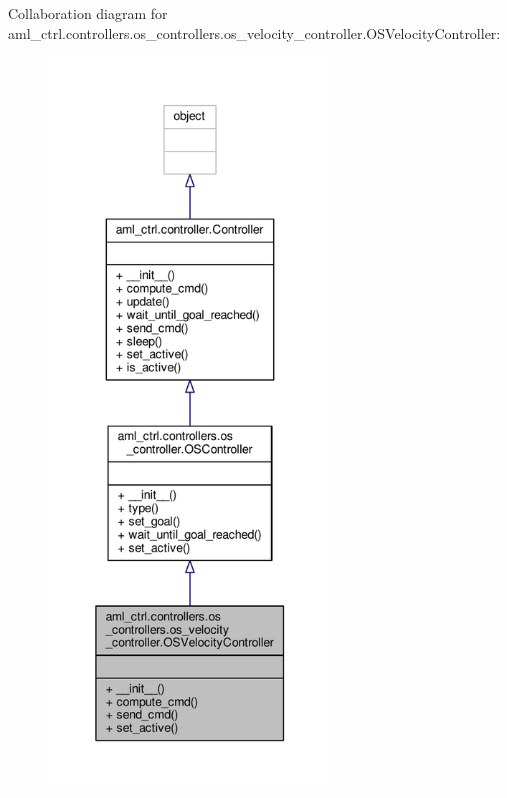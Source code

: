 Collaboration diagram for aml\-\_\-ctrl.\-controllers.\-os\-\_\-controllers.\-os\-\_\-velocity\-\_\-controller.\-O\-S\-Velocity\-Controller\-:
\nopagebreak
\begin{figure}[H]
\begin{center}
\leavevmode
\includegraphics[height=550pt]{classaml__ctrl_1_1controllers_1_1os__controllers_1_1os__velocity__controller_1_1_o_s_velocity_controller__coll__graph}
\end{center}
\end{figure}
